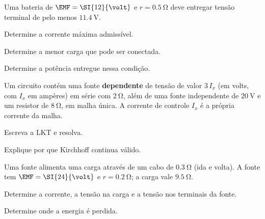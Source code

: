 \begin{questao}[3]{}

Uma bateria de $\EMF=\SI{12}{\volt}$ e $r=\SI{0.5}{\ohm}$ deve entregar tensão
terminal de pelo menos $\SI{11.4}{\volt}$.
\begin{itensq}
\item Determine a corrente máxima admissível.
\item Determine a menor carga que pode ser conectada.
\item Determine a potência entregue nessa condição.
\end{itensq}


\end{questao}
\begin{questao}[3]{}

Um circuito contém uma fonte \textbf{dependente} de tensão de valor
$3\,I_x$ (em volts, com $I_x$ em ampères) em série com $\SI{2}{\ohm}$, além de
uma fonte independente de $\SI{20}{\volt}$ e um resistor de $\SI{8}{\ohm}$, em
malha única. A corrente de controle $I_x$ é a própria corrente da malha.
\begin{itensq}
\item Escreva a LKT e resolva.
\item Explique por que Kirchhoff continua válido.
\end{itensq}


\end{questao}
\begin{questao}[3]{}

Uma fonte alimenta uma carga através de um cabo de $\SI{0.3}{\ohm}$ (ida e
volta). A fonte tem $\EMF=\SI{24}{\volt}$ e $r=\SI{0.2}{\ohm}$; a carga vale
$\SI{9.5}{\ohm}$.
\begin{itensq}
\item Determine a corrente, a tensão na carga e a tensão nos terminais da
      fonte.
\item Determine onde a energia é perdida.
\end{itensq}


\end{questao}

